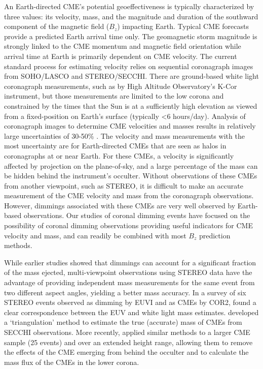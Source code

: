 An Earth-directed CME’s potential geoeffectiveness is typically characterized by three values: its velocity, mass, and the magnitude and duration of the southward component of the magnetic field ($B_z$) impacting Earth. Typical CME forecasts provide a predicted Earth arrival time only. The geomagnetic storm magnitude is strongly linked to the CME momentum and magnetic field orientation while arrival time at Earth is primarily dependent on CME velocity. The current standard process for estimating velocity relies on sequential coronagraph images from SOHO/LASCO and STEREO/SECCHI. There are ground-based white light coronagraph measurements, such as by High Altitude Observatory’s K-Cor instrument, but those measurements are limited to the low corona and constrained by the times that the Sun is at a sufficiently high elevation as viewed from a fixed-position on Earth’s surface (typically <6 hours/day). Analysis of coronagraph images to determine CME velocities and masses results in relatively large uncertainties of 30-50\% \citep{Vourlidas2000, Vourlidas2010, Vourlidas2011}. The velocity and mass measurements with the most uncertainty are for Earth-directed CMEs that are seen as halos in coronagraphs at or near Earth. For these CMEs, a velocity is significantly affected by projection on the plane-of-sky, and a large percentage of the mass can be hidden behind the instrument’s occulter. Without observations of these CMEs from another viewpoint, such as STEREO, it is difficult to make an accurate measurement of the CME velocity and mass from the coronagraph observations. However, dimmings associated with these CMEs are very well observed by Earth-based observations. Our studies of coronal dimming events have focused on the possibility of coronal dimming observations providing useful indicators for CME velocity and mass, and can readily be combined with most $B_z$ prediction methods.

While earlier studies showed that dimmings can account for a significant fraction of the mass ejected, multi-viewpoint observations using STEREO data have the advantage of providing independent mass measurements for the same event from two different aspect angles, yielding a better mass accuracy. In a survey of six STEREO events observed as dimming by EUVI and as CMEs by COR2, \citet{Aschwanden2009} found a clear correspondence between the EUV and white light mass estimates. \citet{Colaninno2009} developed a ‘triangulation’ method to estimate the true (accurate) mass of CMEs from SECCHI observations. More recently, \citet{Bein2013} applied similar methods to a larger CME sample (25 events) and over an extended height range, allowing them to remove the effects of the CME emerging from behind the occulter and to calculate the mass flux of the CMEs in the lower corona.

